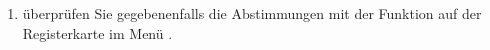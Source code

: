\begin{enumerate}
	\item überprüfen Sie gegebenenfalls die Abstimmungen mit der Funktion  auf der Registerkarte  im Menü .
\end{enumerate}

